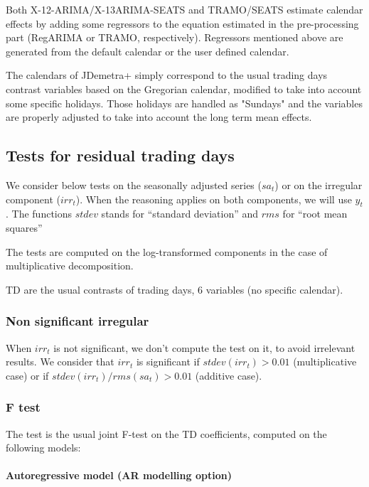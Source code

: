 \documentclass[
  letterpaper,
  DIV=11,
  numbers=noendperiod]{scrreprt}
\let\oldparagraph\paragraph
\renewcommand{\paragraph}[1]{\oldparagraph{#1}\mbox{}}
\begin{document}
Both X-12-ARIMA/X-13ARIMA-SEATS and TRAMO/SEATS estimate calendar
effects by adding some regressors to the equation estimated in the
pre-processing part (RegARIMA or TRAMO, respectively). Regressors
mentioned above are generated from the default calendar or the user
defined calendar.

The calendars of JDemetra+ simply correspond to the usual trading days
contrast variables based on the Gregorian calendar, modified to take
into account some specific holidays. Those holidays are handled as
"Sundays" and the variables are properly adjusted to take into account
the long term mean effects.

\hypertarget{tests-for-residual-trading-days}{%
\subsection{Tests for residual trading
days}\label{tests-for-residual-trading-days}}

We consider below tests on the seasonally adjusted series (\(sa_t\)) or
on the irregular component (\(irr_t\)). When the reasoning applies on
both components, we will use \(y_t\). The functions \(stdev\) stands for
``standard deviation'' and \(rms\) for ``root mean squares''

The tests are computed on the log-transformed components in the case of
multiplicative decomposition.

TD are the usual contrasts of trading days, 6 variables (no specific
calendar).

\hypertarget{non-significant-irregular}{%
\subsubsection{Non significant
irregular}\label{non-significant-irregular}}

When \(irr_t\) is not significant, we don't compute the test on it, to
avoid irrelevant results. We consider that \(irr_t\) is significant if
\(stdev( irr_t)>0.01\) (multiplicative case) or if
\(stdev(irr_t)/rms(sa_t) >0.01\) (additive case).

\hypertarget{f-test}{%
\subsubsection{F test}\label{f-test}}

The test is the usual joint F-test on the TD coefficients, computed on
the following models:

\hypertarget{autoregressive-model-ar-modelling-option}{%
\paragraph{Autoregressive model (AR modelling
option)}\label{autoregressive-model-ar-modelling-option}}
\end{document}
